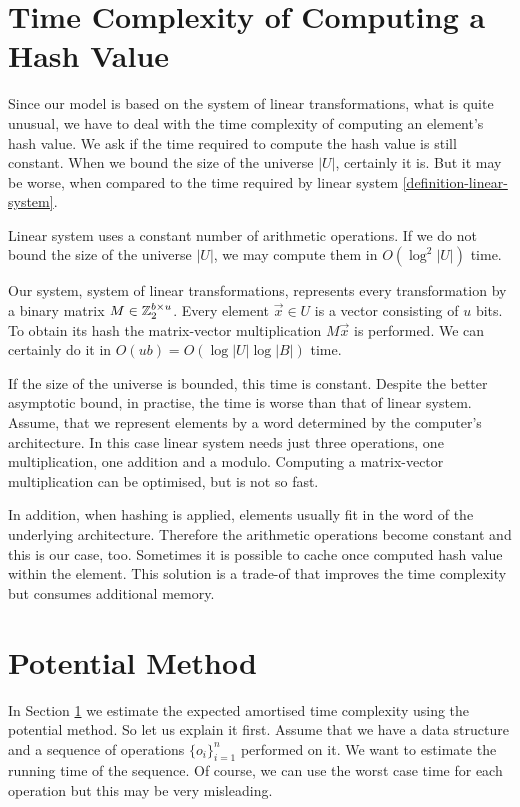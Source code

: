 \section{Time Complexity of Computing a Hash Value}
\label{section-time-complexity}
Since our model is based on the system of linear transformations, what is quite unusual, we have to deal with the time complexity of computing an element's hash value. We ask if the time required to compute the hash value is still constant. When we bound the size of the universe $|U|$, certainly it is. But it may be worse, when compared to the time required by linear system \ref{definition-linear-system}. 

Linear system uses a constant number of arithmetic operations. If we do not bound the size of the universe $|U|$, we may compute them in $O(\log^2 |U|)$ time. 

Our system, system of linear transformations, represents every transformation by a binary matrix $M \in \mathbb{Z}_{2}^{b \times u}$. Every element $\vec{x} \in U$ is a vector consisting of $u$ bits. To obtain its hash the matrix-vector multiplication $M\vec{x}$ is performed. We can certainly do it in $O(u b) = O(\log |U| \log |B|)$ time. 

If the size of the universe is bounded, this time is constant. Despite the better asymptotic bound, in practise, the time is worse than that of linear system. Assume, that we represent elements by a word determined by the computer's architecture. In this case linear system needs just three operations, one multiplication, one addition and a modulo. Computing a matrix-vector multiplication can be optimised, but is not so fast. 

In addition, when hashing is applied, elements usually fit in the word of the underlying architecture. Therefore the arithmetic operations become constant and this is our case, too. Sometimes it is possible to cache once computed hash value within the element. This solution is a trade-of that improves the time complexity but consumes additional memory.

\section{Potential Method} 
In Section \ref{section-time-complexity} we estimate the expected amortised time complexity using the potential method. So let us explain it first. Assume that we have a data structure and a sequence of operations $\{o_i\}_{i = 1}^{n}$ performed on it. We want to estimate the running time of the sequence. Of course, we can use the worst case time for each operation but this may be very misleading. 

